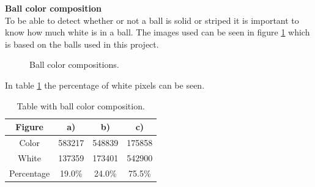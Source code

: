 

\textbf{Ball color composition}\\
To be able to detect whether or not a ball is solid or striped it is important to know how much white is in a ball. The images used can be seen in figure \ref{fig:ballscompo} which is based on the balls used in this project.

\begin{figure}[H]
\centering
{}

\caption{Ball color compositions.}
\label{fig:ballscompo}
\end{figure}

In table \ref{fig:ballscompotable} the percentage of white pixels can be seen.\\


\begin{table}[H]
\centering
\begin{tabular}{|c|c|c|c|}
	\hline Figure & a) & b) & c) \\ 
	\hline Color & 583217 & 548839 & 175858 \\ 
	\hline White & 137359 & 173401 & 542900 \\ 
	\hline Percentage & 19.0\% & 24.0\% & 75.5\% \\ 
	\hline
\end{tabular}
\caption{Table with ball color composition.}
\label{fig:ballscompotable}
\end{table}

